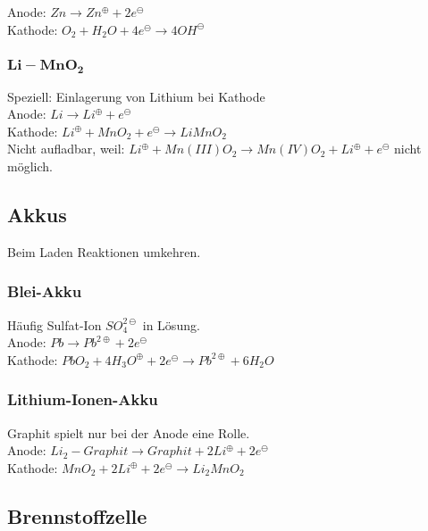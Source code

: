 Anode: $Zn \rightarrow Zn^\oplus + 2e^\ominus$\\

Kathode: $O_2 + H_2O + 4e^\ominus \rightarrow 4OH^\ominus$


\subsubsection{$\boldsymbol{Li-MnO_2}$}

Speziell: Einlagerung von Lithium bei Kathode\\

Anode: $Li \rightarrow Li^\oplus + e^\ominus$\\

Kathode: $Li^\oplus + MnO_2 + e^\ominus \rightarrow LiMnO_2$\\

Nicht aufladbar, weil: $Li^\oplus + Mn(III)O_2 \rightarrow Mn(IV)O_2 + Li^\oplus + e^\ominus$ nicht möglich.

\subsection{Akkus}

Beim Laden Reaktionen umkehren.

\subsubsection{Blei-Akku}

Häufig Sulfat-Ion $SO_4^{2\ominus}$ in Lösung.\\

Anode: $Pb \rightarrow Pb^{2\oplus}+2e^\ominus$\\

Kathode: $PbO_2 + 4 H_3O^\oplus + 2e^\ominus \rightarrow Pb^{2\oplus} + 6H_2O$

\subsubsection{Lithium-Ionen-Akku}

Graphit spielt nur bei der Anode eine Rolle.\\

Anode: $Li_2-Graphit \rightarrow  Graphit + 2Li^\oplus + 2e^\ominus$\\

Kathode: $MnO_2+2Li^\oplus + 2e^\ominus \rightarrow Li_2MnO_2$

\subsection{Brennstoffzelle}

